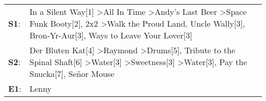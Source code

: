 \begin{supertabular}{p{0.03\textwidth}p{0.92\textwidth}}
 \textbf{S1}:  &  In a Silent Way[1]\textsuperscript{} \textgreater \enspace All In Time\textsuperscript{} \textgreater \enspace Andy's Last Beer\textsuperscript{} \textgreater \enspace Space Funk Booty[2]\textsuperscript{}, \enspace 2x2\textsuperscript{} \textgreater \enspace Walk the Proud Land\textsuperscript{}, \enspace Uncle Wally[3]\textsuperscript{}, \enspace Bron-Yr-Aur[3]\textsuperscript{},  Ways to Leave Your Lover[3]\textsuperscript{}  \enspace  \\
 \textbf{S2}:  &                Der Bluten Kat[4]\textsuperscript{} \textgreater \enspace Raymond\textsuperscript{} \textgreater \enspace Drums[5]\textsuperscript{}, \enspace Tribute to the Spinal Shaft[6]\textsuperscript{} \textgreater \enspace Water[3]\textsuperscript{} \textgreater \enspace Sweetness[3]\textsuperscript{} \textgreater \enspace Water[3]\textsuperscript{}, \enspace Pay the Snucka[7]\textsuperscript{}, \enspace Señor Mouse\textsuperscript{}  \enspace  \\
 \textbf{E1}:  &                                                                                                                                                                                                                                                                                                                                                                                                                                     Lenny\textsuperscript{}  \enspace  \\
\end{supertabular}
